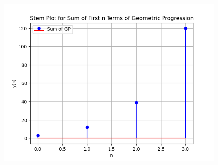 \documentclass[journal,12pt,twocolumn]{IEEEtran}
\theoremstyle{remark}
\begin{document}
\begin{figure}
   \includegraphics[width=1\linewidth]{figs/i2.png}
\end{figure}
\end{document}
